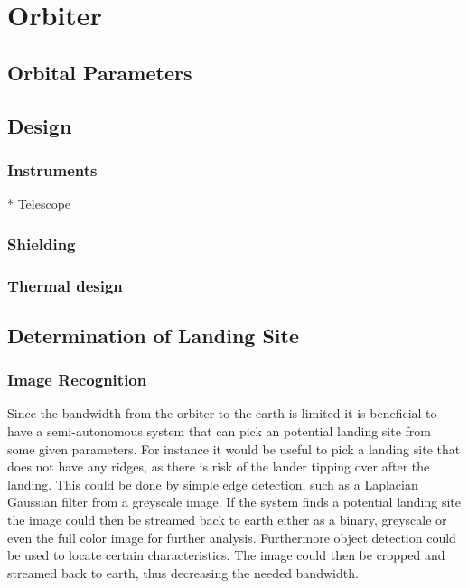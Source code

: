 \chapter{Orbiter}

\section{Orbital Parameters}

\section{Design}

\subsection{Instruments}

* Telescope

\subsection{Shielding}

\subsection{Thermal design}

\section{Determination of Landing Site}

\subsection{Image Recognition} %

Since the bandwidth from the orbiter to the earth is limited it is beneficial to have a semi-autonomous system that can pick an potential landing site from some given parameters. For instance it would be useful to pick a landing site that does not have any ridges, as there is risk of the lander tipping over after the landing. This could be done by simple edge detection, such as a Laplacian Gaussian filter from a greyscale image. If the system finds a potential landing site the image could then be streamed back to earth either as a binary, greyscale or even the full color image for further analysis. Furthermore object detection could be used to locate certain characteristics. The image could then be cropped and streamed back to earth, thus decreasing the needed bandwidth.

